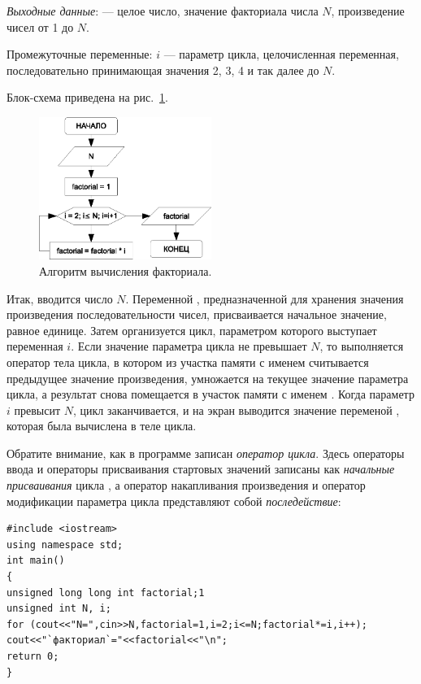 \emph{Выходные данные}:  --- целое число, значение факториала числа $N$,
произведение чисел от 1 до $N$.

Промежуточные переменные: $i$ --- параметр цикла, целочисленная переменная, последовательно принимающая
значения 2, 3, 4 и так далее до $N$.

Блок-схема приведена на рис.~\ref{ch03:refDrawing28}.
\begin{figure}[htb]
\begin{center}
\includegraphics[width=0.5\textwidth]{img/ris_3_29}
\caption{Алгоритм вычисления факториала.}
\label{ch03:refDrawing28}
\end{center}
\end{figure}


Итак, вводится число $N$. Переменной , предназначенной для хранения
значения произведения последовательности чисел, присваивается начальное значение, равное единице. Затем организуется
цикл, параметром которого выступает переменная $i$. Если значение параметра цикла не превышает
$N$, то выполняется оператор тела цикла, в котором из участка памяти с именем
 считывается предыдущее значение произведения, умножается на текущее значение параметра
цикла, а результат снова помещается в участок памяти с именем . Когда параметр
$i$ превысит $N$, цикл заканчивается, и на экран выводится значение переменой
, которая была вычислена в теле цикла.

Обратите внимание, как в программе записан \emph{оператор цикла}. Здесь операторы ввода и операторы
присваивания стартовых значений записаны как \emph{начальные присваивания} цикла , а
оператор накапливания произведения и оператор модификации параметра цикла представляют собой
\emph{последействие}:
\begin{lstlisting}
#include <iostream>
using namespace std;
int main()
{
unsigned long long int factorial;1
unsigned int N, i;
for (cout<<"N=",cin>>N,factorial=1,i=2;i<=N;factorial*=i,i++);
cout<<"`факториал`="<<factorial<<"\n";
return 0;
}
\end{lstlisting}

